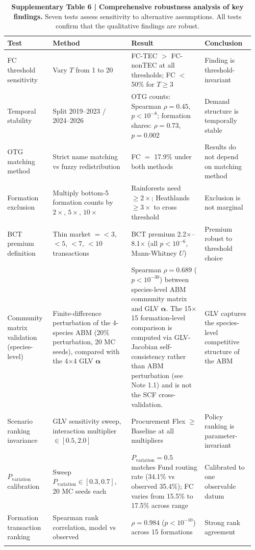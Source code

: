 \documentclass[pdflatex,sn-nature,oneside]{sn-jnl}
\begin{document}
\begin{table}[h]
\caption{%
  \textbf{Supplementary Table 6 | Comprehensive robustness analysis of key findings.}
  Seven tests assess sensitivity to alternative assumptions.
  All tests confirm that the qualitative findings are robust.
}\label{tab:supp_robustness}
\begin{tabular}{@{}p{2.7cm}p{3.0cm}p{4.2cm}p{3.5cm}@{}}
\toprule
Test & Method & Result & Conclusion \\
\midrule
FC threshold sensitivity
  & Vary $T$ from 1 to 20
  & FC-TEC $>$ FC-nonTEC at all thresholds; FC $<$ 50\% for $T \geq 3$
  & Finding is threshold-invariant \\[4pt]
Temporal stability
  & Split 2019--2023 / 2024--2026
  & OTG counts: Spearman $\rho = 0.45$, $p < 10^{-8}$; formation shares: $\rho = 0.73$, $p = 0.002$
  & Demand structure is temporally stable \\[4pt]
OTG matching method
  & Strict name matching vs fuzzy redistribution
  & FC $=$ 17.9\% under both methods
  & Results do not depend on matching method \\[4pt]
Formation exclusion
  & Multiply bottom-5 formation counts by $2\times$, $5\times$, $10\times$
  & Rainforests need ${\geq}2\times$; Heathlands ${\geq}3\times$ to cross threshold
  & Exclusion is not marginal \\[4pt]
BCT premium definition
  & Thin market $= {<}3$, ${<}5$, ${<}7$, ${<}10$ transactions
  & BCT premium 2.2$\times$--8.1$\times$ (all $p < 10^{-6}$, Mann-Whitney $U$)
  & Premium robust to threshold choice \\[4pt]
Community matrix validation (species-level)
  & Finite-difference perturbation of the 4-species ABM (20\% perturbation,
    20 MC seeds), compared with the 4$\times$4 GLV $\boldsymbol\alpha$
  & Spearman $\rho = 0.689$ ($p < 10^{-30}$) between species-level ABM
    community matrix and GLV $\boldsymbol\alpha$. The 15$\times$15
    formation-level comparison is computed via GLV-Jacobian self-consistency
    rather than ABM perturbation (see Note 1.1) and is not the SCF cross-validation.
  & GLV captures the species-level competitive structure of the ABM \\[4pt]
Scenario ranking invariance
  & GLV sensitivity sweep, interaction multiplier $\in [0.5, 2.0]$
  & Procurement Flex $\geq$ Baseline at all multipliers
  & Policy ranking is parameter-invariant \\[4pt]
$P_{\text{variation}}$ calibration
  & Sweep $P_{\text{variation}} \in [0.3, 0.7]$, 20 MC seeds each
  & $P_{\text{variation}} = 0.5$ matches Fund routing rate (34.1\% vs observed 35.4\%);
    FC varies from 15.5\% to 17.5\% across range
  & Calibrated to one observable datum \\[4pt]
Formation transaction ranking
  & Spearman rank correlation, model vs observed
  & $\rho = 0.984$ ($p < 10^{-10}$) across 15 formations
  & Strong rank agreement \\
\botrule
\end{tabular}
\end{table}
\end{document}
